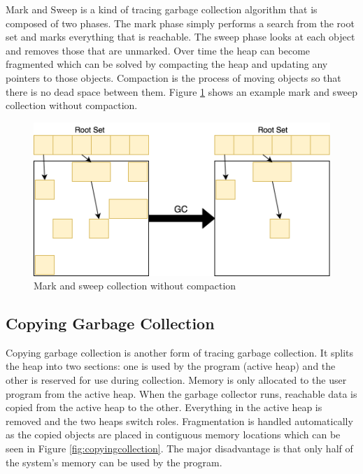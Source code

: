 \documentclass[../diss.tex]{subfiles}
\begin{document}
Mark and Sweep is a kind of tracing garbage collection algorithm that is composed of two phases. The mark phase simply performs a search from the root set and marks everything that is reachable. The sweep phase looks at each object and removes those that are unmarked. Over time the heap can become fragmented which can be solved by compacting the heap and updating any pointers to those objects. Compaction is the process of moving objects so that there is no dead space between them. Figure \ref{fig:markandsweepcollection} shows an example mark and sweep collection without compaction.

\begin{figure}
    \centering
    \includegraphics[max width=\linewidth]{figs/markandsweep.png}
    \caption{Mark and sweep collection without compaction}
    \label{fig:markandsweepcollection}
\end{figure}

\subsection{Copying Garbage Collection}

Copying garbage collection\cite{copyingcollector} is another form of tracing garbage collection. It splits the heap into two sections: one is used by the program (active heap) and the other is reserved for use during collection. Memory is only allocated to the user program from the active heap. When the garbage collector runs, reachable data is copied from the active heap to the other. Everything in the active heap is removed and the two heaps switch roles. Fragmentation is handled automatically as the copied objects are placed in contiguous memory locations which can be seen in Figure \ref{fig:copyingcollection}. The major disadvantage is that only half of the system's memory can be used by the program.
\end{document}
